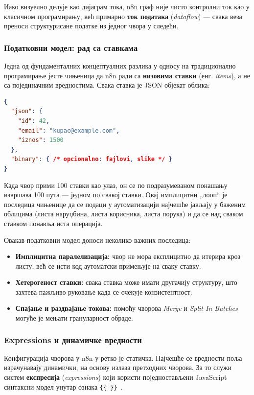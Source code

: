 Иако визуелно делује као дијаграм тока, n8n граф није чисто
контролни ток као у класичном програмирању, већ примарно
\textbf{ток података} (\textit{dataflow}) — свака веза преноси
структурисане податке из једног чвора у следећи.

\subsubsection{Податковни модел: рад са ставкама}

Једна од фундаменталних концептуалних разлика у односу на
традиционално програмирање јесте чињеница да n8n ради са
\textbf{низовима ставки} (енг. \textit{items}), а не са појединачним
вредностима. Свака ставка је JSON објекат облика:

\begin{lstlisting}[language=json, caption={Struktura stavke u n8n}]
{
  "json": {
    "id": 42,
    "email": "kupac@example.com",
    "iznos": 1500
  },
  "binary": { /* opcionalno: fajlovi, slike */ }
}
\end{lstlisting}

Када чвор прими 100 ставки као улаз, он се по подразумеваном
понашању извршава 100 пута — једном по свакој ставки. Овај
имплицитни „лооп“ је последица чињенице да се подаци у
аутоматизацији најчешће јављају у баженим облицима (листа
наруџбина, листа корисника, листа порука) и да се над сваком
ставком понавља иста операција.

Овакав податковни модел доноси неколико важних последица:

\begin{itemize}
    \item \textbf{Имплицитна паралелизација:} чвор не мора експлицитно
    да итерира кроз листу, већ се исти код аутоматски примењује на
    сваку ставку.
    \item \textbf{Хетерогеност ставки:} свака ставка може имати
    другачију структуру, што захтева пажљиво руковање када се
    очекује конзистентност.
    \item \textbf{Спајање и раздвајање токова:} помоћу чворова
    \textit{Merge} и \textit{Split In Batches} могуће је мењати
    грануларност обраде.
\end{itemize}

\subsubsection{Expressions и динамичке вредности}

Конфигурација чворова у n8n-у ретко је статичка. Најчешће се
вредности поља израчунавају динамички, на основу излаза претходних
чворова. За то служи систем \textbf{експресија} (\textit{expressions})
који користи поједностављени JavaScript синтаксни модел унутар
ознака \texttt{\{\{ \}\}}~\cite{n8n}.

